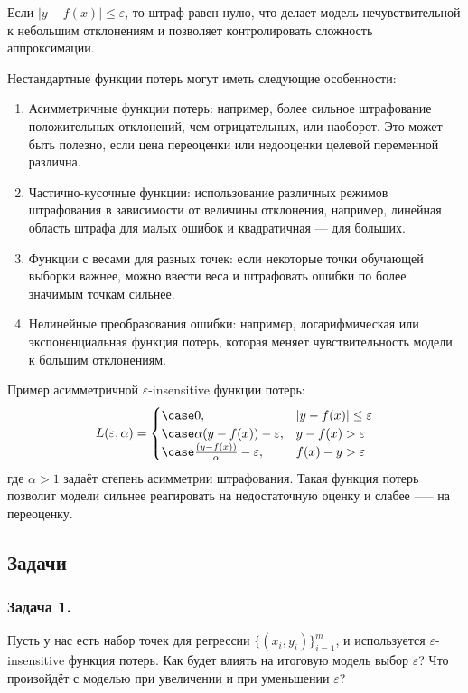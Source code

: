 Если \(| y - f(x) | \leq \varepsilon\), то штраф равен нулю, что делает модель нечувствительной к небольшим отклонениям и позволяет контролировать сложность аппроксимации.

Нестандартные функции потерь могут иметь следующие особенности:

\begin{enumerate}
    \item Асимметричные функции потерь: например, более сильное штрафование положительных отклонений, чем отрицательных, или наоборот. Это может быть полезно, если цена переоценки или недооценки целевой переменной различна.
    \item Частично-кусочные функции: использование различных режимов штрафования в зависимости от величины отклонения, например, линейная область штрафа для малых ошибок и квадратичная — для больших.
    \item Функции с весами для разных точек: если некоторые точки обучающей выборки важнее, можно ввести веса и штрафовать ошибки по более значимым точкам сильнее.
    \item Нелинейные преобразования ошибки: например, логарифмическая или экспоненциальная функция потерь, которая меняет чувствительность модели к большим отклонениям.
\end{enumerate}

Пример асимметричной \(\varepsilon\)-insensitive функции потерь:
\begin{align*}
    L(\varepsilon, \alpha) = 
        \begin{cases}
            \case 0, & | y - f(x) | \leq \varepsilon \\
            \case \alpha(y - f(x)) - \varepsilon, & y - f(x) > \varepsilon \\
            \case \frac{(y - f(x))}{\alpha} - \varepsilon, & f(x) - y > \varepsilon
        \end{cases}
\end{align*}
где \(\alpha > 1\) задаёт степень асимметрии штрафования. Такая функция потерь позволит модели сильнее реагировать на недостаточную оценку и слабее —-- на переоценку.

\newpage
\subsection*{Задачи}

\subsubsection*{Задача 1.}
Пусть у нас есть набор точек для регрессии \(\{(x_i, y_i)\}_{i=1}^m\), и используется \(\varepsilon\)-insensitive функция потерь. Как будет влиять на итоговую модель выбор \(\varepsilon\)? Что произойдёт с моделью при увеличении и при уменьшении \(\varepsilon\)?

